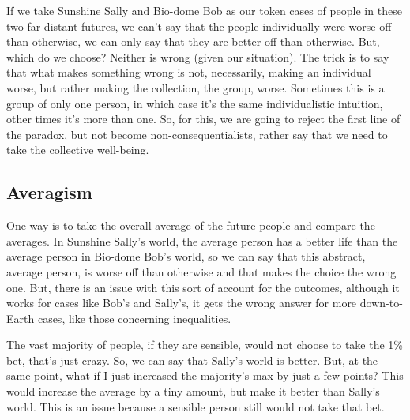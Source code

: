 If we take Sunshine Sally and Bio-dome Bob as our token cases of people in these two far distant futures, we can’t say that the people individually were worse off than otherwise, we can only say that they are better off than otherwise. But, which do we choose? Neither is wrong (given our situation). The trick is to say that what makes something wrong is not, necessarily, making an individual worse, but rather making the collection, the group, worse. Sometimes this is a group of only one person, in which case it’s the same individualistic intuition, other times it’s more than one. So, for this, we are going to reject the first line of the paradox, but not become non-consequentialists, rather say that we need to take the collective well-being. 
\subsection{Averagism}

One way is to take the overall average of the future people and compare the averages. In Sunshine Sally’s world, the average person has a better life than the average person in Bio-dome Bob’s world, so we can say that this abstract, average person, is worse off than otherwise and that makes the choice the wrong one. But, there is an issue with this sort of account for the outcomes, although it works for cases like Bob's and Sally's, it gets the wrong answer for more down-to-Earth cases, like those concerning inequalities. 


The vast majority of people, if they are sensible, would not choose to take the 1\% bet, that's just crazy. So, we can say that Sally's world is better. But, at the same point, what if I just increased the majority's max by just a few points? This would increase the average by a tiny amount, but make it better than Sally's world. This is an issue because a sensible person still would not take that bet. 
